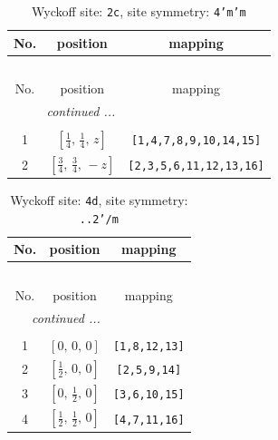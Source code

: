 \documentclass[fleqn,8pt]{jsarticle}
\begin{document}
\renewcommand{\arraystretch}{1.2}
\begin{longtable}{ccc}
\caption{Wyckoff site: {\tt 2c}, site symmetry: {\tt 4'm'm}}
 \\
 \hline \hline
No. & position & mapping \\ \hline \endfirsthead

\multicolumn{2}{l}{\tablename\ \thetable{}} \\
 \hline \hline
No. & position & mapping \\ \hline \endhead

 \hline \hline
\multicolumn{2}{r}{\footnotesize\it continued ...} \\ \endfoot

 \hline \hline
\multicolumn{2}{r}{} \\ \endlastfoot

1 & $\left[ \frac{1}{4},\, \frac{1}{4},\, z \right]$ & {\tt [1,4,7,8,9,10,14,15]} \\ \hline
2 & $\left[ \frac{3}{4},\, \frac{3}{4},\, - z \right]$ & {\tt [2,3,5,6,11,12,13,16]} \\
\end{longtable}
\renewcommand{\arraystretch}{1.2}
\begin{longtable}{ccc}
\caption{Wyckoff site: {\tt 4d}, site symmetry: {\tt ..2'/m}}
 \\
 \hline \hline
No. & position & mapping \\ \hline \endfirsthead

\multicolumn{2}{l}{\tablename\ \thetable{}} \\
 \hline \hline
No. & position & mapping \\ \hline \endhead

 \hline \hline
\multicolumn{2}{r}{\footnotesize\it continued ...} \\ \endfoot

 \hline \hline
\multicolumn{2}{r}{} \\ \endlastfoot

1 & $\left[ 0,\, 0,\, 0 \right]$ & {\tt [1,8,12,13]} \\ \hline
2 & $\left[ \frac{1}{2},\, 0,\, 0 \right]$ & {\tt [2,5,9,14]} \\ \hline
3 & $\left[ 0,\, \frac{1}{2},\, 0 \right]$ & {\tt [3,6,10,15]} \\ \hline
4 & $\left[ \frac{1}{2},\, \frac{1}{2},\, 0 \right]$ & {\tt [4,7,11,16]} \\
\end{longtable}
\renewcommand{\arraystretch}{1.2}
\end{document}
